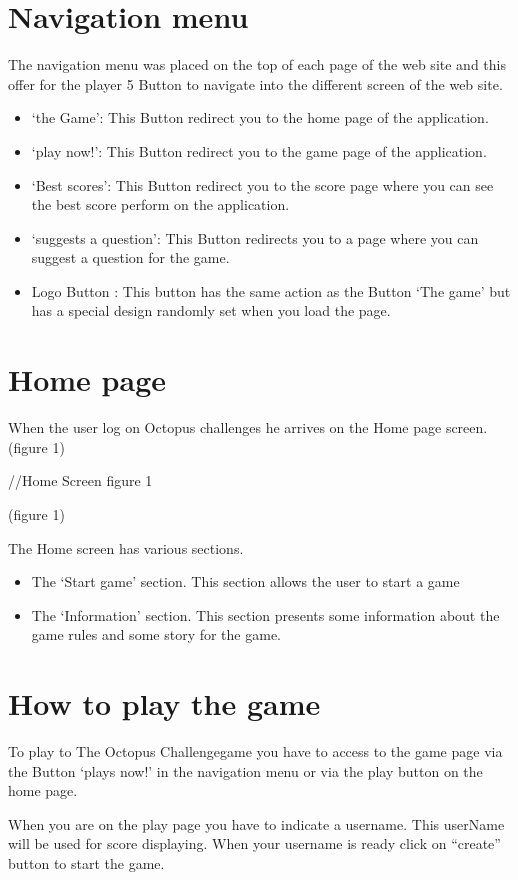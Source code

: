 \documentclass[a4paper,11pt, oneside]{book}
\def\appName{The Octopus Challenge}
\begin{document}
	\section{Navigation menu}
	The navigation menu was placed on the top of each page of the web site and this offer for the player 5 Button to navigate into the different screen of the web site.
	\begin{itemize}
		\item ‘the Game’: This Button redirect you to the home page of the application.
		\item ‘play now!’: This Button redirect you to the game page of the application.
		\item ‘Best scores’: This Button redirect you to the score page where you can see the best score perform on the application.
		\item ‘suggests a question’: This Button redirects you to a page where you can suggest a question for the game.
		\item Logo Button : This button has the same action as the Button ‘The game’ but has a special design randomly set when you load the page.
	\end{itemize}
	
	\section{Home page}
	When the user log on Octopus challenges he arrives on the Home page screen.(figure 1)

//Home Screen figure 1


(figure 1)

The Home screen has various sections.
\begin{itemize}
	\item The ‘Start game’ section. This section allows the user to start a game
	\item The ‘Information’ section. This section presents some information about the game rules and some story for the game.
\end{itemize}
	
	
	\section{How to play the game}
	
	To play to \appName game you have to access to the game page via the Button ‘plays now!’ in the navigation menu or via the play button on the home page.

When you are on the play page you have to indicate a username.
This userName will be used for score displaying.
When your username is ready click on “create” button to start the game.
\end{document}
